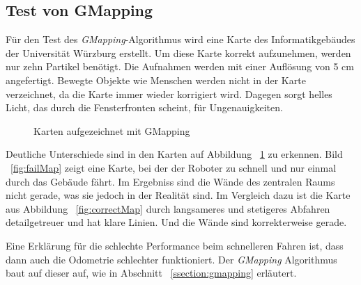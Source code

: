\documentclass[11pt,a4paper]{article}
\begin{document}
{\subsection{Test von GMapping}


{
	F\"ur den Test des \textit{GMapping}-Algorithmus wird eine Karte des Informatikgeb\"audes der Universit\"at W\"urzburg erstellt. Um diese Karte korrekt aufzunehmen, werden nur zehn Partikel ben\"otigt. Die Aufnahmen werden mit einer Aufl\"osung von 5 cm angefertigt. Bewegte Objekte wie Menschen werden nicht in der Karte verzeichnet, da die Karte immer wieder korrigiert wird. Dagegen sorgt helles Licht, das durch die Fensterfronten scheint, f\"ur  Ungenauigkeiten. 
	
	\begin{figure}[h]
		\centering
		\caption{Karten aufgezeichnet mit GMapping \label{fig:maps}}
	\end{figure}
	
	
	Deutliche Unterschiede sind in den Karten auf Abbildung ~\ref{fig:maps} zu erkennen. Bild ~\ref{fig:failMap} zeigt eine Karte, bei der der Roboter zu schnell und nur einmal durch das Geb\"aude f\"ahrt. Im Ergebniss sind die W\"ande des zentralen Raums nicht gerade, was sie jedoch in der Realit\"at sind. Im Vergleich dazu ist die Karte aus Abbildung ~\ref{fig:correctMap} durch langsameres und stetigeres Abfahren detailgetreuer und hat klare Linien. Und die W\"ande sind korrekterweise gerade.
	
	
	Eine Erkl\"arung f\"ur die schlechte Performance beim schnelleren Fahren ist, dass dann auch die Odometrie schlechter funktioniert. Der \textit{GMapping} Algorithmus baut auf dieser auf, wie in Abschnitt ~\ref{ssection:gmapping} erl\"autert.
}




}
\end{document}
